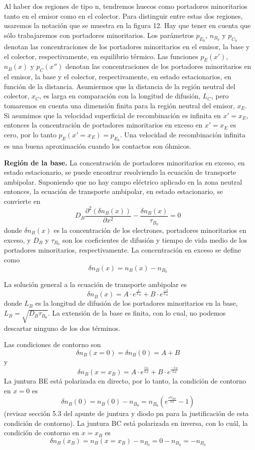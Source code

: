 \documentclass[12pt,a4paper]{article}
\begin{document}
Al haber dos regiones de tipo n, tendremos huecos como portadores minoritarios tanto en el emisor como en el colector. Para distinguir entre estas dos regiones, usaremos la notación que se muestra en la figura 12. Hay que tener en cuenta que sólo trabajaremos con portadores minoritarios. Los parámetros $p_{E_{0}}$, $n_{B_{0}}$ y $p_{C_{0}}$ denotan las concentraciones de los portadores minoritarios en el emisor, la base y el colector, respectivamente, en equilibrio térmico. Las funciones $p_{E}(x')$, $n_{B}(x)$ y $p_{C}(x'')$ denotan las concentraciones de los portadores minoritarios en el emisor, la base y el colector, respectivamente, en estado estacionarios, en función de la distancia. Asumiermos que la distancia de la región neutral del colector, $x_{C}$, es larga en comparación con la longitud de difusión, $L_{C}$, pero tomaremos en cuenta una dimensión finita para la región neutral del emisor, $x_{E}$. Si asumimos que la velocidad superficial de recombinación es infinita en $x'=x_{E}$, entonces la concentración de portadores minoritarios en exceso en $x'=x_{E}$ es cero, por lo tanto $p_{E}(x'=x_{E})=p_{E_{0}}$. Una velocidad de recombinación infinita es una buena aproximación cuando los contactos son óhmicos.

\textbf{Región de la base.} La concentración de portadores minoritarios en exceso, en estado estacionario, se puede encontrar resolviendo la ecuación de transporte ambipolar. Suponiendo que no hay campo eléctrico aplicado en la zona neutral entonces, la ecuación de transporte ambipolar, en estado estacionario, se convierte en
\[ D_{B} \frac{\partial^{2} (\delta n_{B}(x))}{\partial x^{2}} - \frac{\delta n_{B}(x)}{\tau _{B_{0}}}=0 \]
donde $\delta n_{B}(x)$ es la concentración de los electrones, portadores minoritarios en exceso, y $D_{B}$ y $\tau _{B_{0}}$ son los coeficientes de difusión y tiempo de vida medio de los portadores minoritarios, respectivamente. La concentración en exceso se define como
\[ \delta n_{B}(x)=n_{B}(x)-n_{B_{0}} \]

La solución general a la ecuación de transporte ambipolar es
\[ \delta n_{B}(x)=A \cdot e^{\frac{x}{L_{B}}}+B \cdot e^{\frac{-x}{L_{B}}} \]
donde $L_{B}$ es la longitud de difusión de los portadores minoritarios en la base, $L_{B}=\sqrt{D_{B}\tau _{B_{0}}}$. La extensión de la base es finita, con lo cual, no podemos descartar ninguno de los dos términos.

Las condiciones de contorno son
\[ \delta n_{B}(x=0)=\delta n_{B}(0)=A+B \]
y
\[ \delta n_{B}(x=x_{B})=A \cdot e^{\frac{x_{B}}{L_{B}}} + B \cdot e^{\frac{-x_{B}}{L_{B}}} \]
La juntura BE está polarizada en directo, por lo tanto, la condición de contorno en $x=0$ es
\[ \delta n_{B}(0)=n_{B}(0)-n_{B_{0}}=n_{B_{0}}(e^{\frac{eV_{BE}}{kT}}-1) \]
(revisar sección 5.3 del apunte de juntura y diodo pn para la justificación de esta condición de contorno). La juntura BC está polarizada en inversa, con lo cuál, la condición de contorno en $x=x_{B}$ es
\[ \delta n_{B}(x_{B})=n_{B}(x=x_{B})-n_{B_{0}}=0-n_{B_{0}}=-n_{B_{0}} \]
\end{document}

